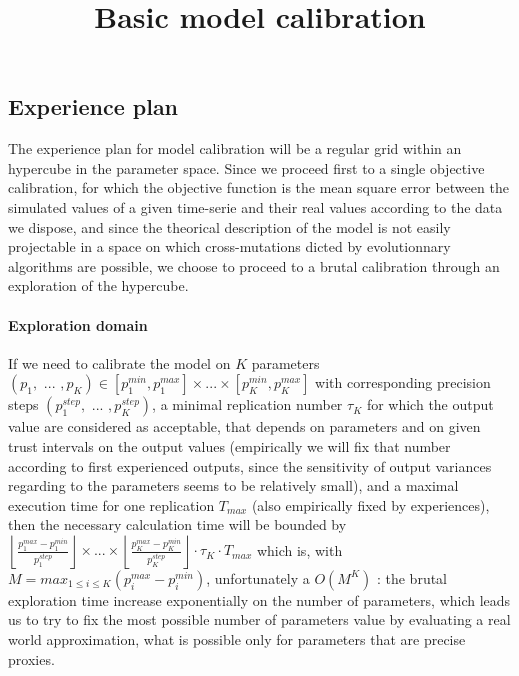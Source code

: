 \documentclass[english]{article}
\begin{document}
\title{Basic model calibration}

\maketitle

\subsection*{Experience plan}

The experience plan for model calibration will be a regular grid within
an hypercube in the parameter space. Since we proceed first to a single
objective calibration, for which the objective function is the mean
square error between the simulated values of a given time-serie and
their real values according to the data we dispose, and since the
theorical description of the model is not easily projectable in a
space on which cross-mutations dicted by evolutionnary algorithms
are possible, we choose to proceed to a brutal calibration through
an exploration of the hypercube.


\paragraph*{Exploration domain}

If we need to calibrate the model on $K$ parameters $(p_{1},\textrm{ ... },p_{K})\in[p_{1}^{min},p_{1}^{max}]\times...\times[p_{K}^{min},p_{K}^{max}]$
with corresponding precision steps $(p_{1}^{step},\textrm{ ... },p_{K}^{step})$,
a minimal replication number $\tau_{K}$ for which the output value
are considered as acceptable, that depends on parameters and on given
trust intervals on the output values (empirically we will fix that
number according to first experienced outputs, since the sensitivity
of output variances regarding to the parameters seems to be relatively
small), and a maximal execution time for one replication $T_{max}$
(also empirically fixed by experiences), then the necessary calculation
time will be bounded by $\left\lfloor \frac{p_{1}^{max}-p_{1}^{min}}{p_{1}^{step}}\right\rfloor \times...\times\left\lfloor \frac{p_{K}^{max}-p_{K}^{min}}{p_{K}^{step}}\right\rfloor \cdot\tau_{K}\cdot T_{max}$
which is, with $M=max_{1\leq i\leq K}(p_{i}^{max}-p_{i}^{min})$,
unfortunately a $O(M^{K})$ : the brutal exploration time increase
exponentially on the number of parameters, which leads us to try to
fix the most possible number of parameters value by evaluating a real
world approximation, what is possible only for parameters that are
precise proxies.
\end{document}
